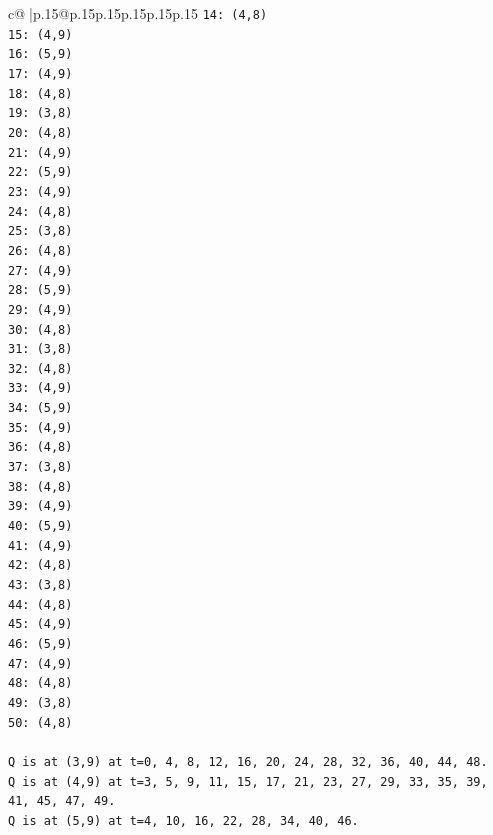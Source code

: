 \documentclass{article}
\begin{document}
{\begin{supertabular}{c@{$\;$}|p{.15\linewidth}@{}p{.15\linewidth}p{.15\linewidth}p{.15\linewidth}p{.15\linewidth}p{.15\linewidth}}
{{{\texttt{14: (4,8)} \\
\texttt{15: (4,9)} \\
\texttt{16: (5,9)} \\
\texttt{17: (4,9)} \\
\texttt{18: (4,8)} \\
\texttt{19: (3,8)} \\
\texttt{20: (4,8)} \\
\texttt{21: (4,9)} \\
\texttt{22: (5,9)} \\
\texttt{23: (4,9)} \\
\texttt{24: (4,8)} \\
\texttt{25: (3,8)} \\
\texttt{26: (4,8)} \\
\texttt{27: (4,9)} \\
\texttt{28: (5,9)} \\
\texttt{29: (4,9)} \\
\texttt{30: (4,8)} \\
\texttt{31: (3,8)} \\
\texttt{32: (4,8)} \\
\texttt{33: (4,9)} \\
\texttt{34: (5,9)} \\
\texttt{35: (4,9)} \\
\texttt{36: (4,8)} \\
\texttt{37: (3,8)} \\
\texttt{38: (4,8)} \\
\texttt{39: (4,9)} \\
\texttt{40: (5,9)} \\
\texttt{41: (4,9)} \\
\texttt{42: (4,8)} \\
\texttt{43: (3,8)} \\
\texttt{44: (4,8)} \\
\texttt{45: (4,9)} \\
\texttt{46: (5,9)} \\
\texttt{47: (4,9)} \\
\texttt{48: (4,8)} \\
\texttt{49: (3,8)} \\
\texttt{50: (4,8)} \\
\\ 
\texttt{Q is at (3,9) at t=0, 4, 8, 12, 16, 20, 24, 28, 32, 36, 40, 44, 48.} \\
\texttt{Q is at (4,9) at t=3, 5, 9, 11, 15, 17, 21, 23, 27, 29, 33, 35, 39, 41, 45, 47, 49.} \\
\texttt{Q is at (5,9) at t=4, 10, 16, 22, 28, 34, 40, 46.} \\
}}}
\end{supertabular}}
\end{document}
